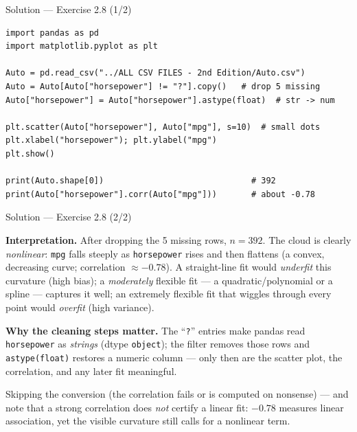 \documentclass[aspectratio=169,11pt]{beamer}
\begin{document}
\begin{frame}[fragile]{Solution --- Exercise 2.8 (1/2)}
\begin{solutionbox}
\begin{lstlisting}
import pandas as pd
import matplotlib.pyplot as plt

Auto = pd.read_csv("../ALL CSV FILES - 2nd Edition/Auto.csv")
Auto = Auto[Auto["horsepower"] != "?"].copy()   # drop 5 missing
Auto["horsepower"] = Auto["horsepower"].astype(float)  # str -> num

plt.scatter(Auto["horsepower"], Auto["mpg"], s=10)  # small dots
plt.xlabel("horsepower"); plt.ylabel("mpg")
plt.show()

print(Auto.shape[0])                              # 392
print(Auto["horsepower"].corr(Auto["mpg"]))       # about -0.78
\end{lstlisting}
\end{solutionbox}
\end{frame}

\begin{frame}{Solution --- Exercise 2.8 (2/2)}
\begin{solutionbox}
\textbf{Interpretation.} After dropping the 5 missing rows, $n=392$.
The cloud is clearly \emph{nonlinear}: \texttt{mpg} falls steeply as
\texttt{horsepower} rises and then flattens (a convex, decreasing
curve; correlation $\approx-0.78$). A straight-line fit would
\emph{underfit} this curvature (high bias); a \emph{moderately}
flexible fit --- a quadratic/polynomial or a spline --- captures it
well; an extremely flexible fit that wiggles through every point would
\emph{overfit} (high variance).

\textbf{Why the cleaning steps matter.} The ``\texttt{?}'' entries make
pandas read \texttt{horsepower} as \emph{strings} (dtype
\texttt{object}); the filter removes those rows and
\texttt{astype(float)} restores a numeric column --- only then are the
scatter plot, the correlation, and any later fit meaningful.
\end{solutionbox}
\begin{mistake}
Skipping the conversion (the correlation
fails or is computed on nonsense) --- and note that a strong
correlation does \emph{not} certify a linear fit: $-0.78$ measures
linear association, yet the visible curvature still calls for a
nonlinear term.
\end{mistake}
\end{frame}
\end{document}
